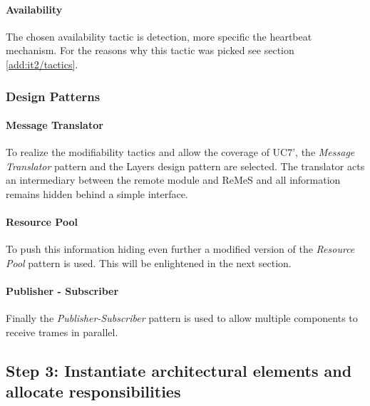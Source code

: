 \paragraph{Availability}

\npar The chosen availability tactic is detection, more specific the heartbeat
mechanism. For the reasons why this tactic was picked see section
\ref{add:it2/tactics}.

\subsubsection{Design Patterns}
\label{add:it2/patterns}

\paragraph{Message Translator}

\npar To realize the modifiability tactics and allow the coverage of UC7', the
\emph{Message Translator} pattern \citep[see][p.~229]{Buschmann:07} and the
Layers design pattern \citep[see][p.~185]{Buschmann:07} are selected.
The translator acts an intermediary between the remote module and ReMeS and all
information remains hidden behind a simple interface.

\paragraph{Resource Pool}

\npar To push this information hiding even further a modified version of the
\emph{Resource Pool} pattern is used. This will be enlightened in the next
section.

\paragraph{Publisher - Subscriber}

\npar Finally the \emph{Publisher-Subscriber} pattern
\citep[see][p.~234]{Buschmann:07} is used to allow multiple components to
receive trames in parallel.

\subsection{Step 3: Instantiate architectural elements and allocate responsibilities}
\label{add:it2/elements}

